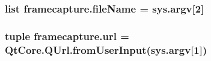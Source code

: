 \subsubsection[{file\+Name}]{\setlength{\rightskip}{0pt plus 5cm}list framecapture.\+file\+Name = sys.\+argv\mbox{[}2\mbox{]}}\label{namespaceframecapture_a9986642fe1c3b56d649b6411961b7ed5}
\hypertarget{namespaceframecapture_aff59b23fef660dedf48b2a105fa7d427}{}
\subsubsection[{url}]{\setlength{\rightskip}{0pt plus 5cm}tuple framecapture.\+url = Qt\+Core.\+Q\+Url.\+from\+User\+Input(sys.\+argv\mbox{[}1\mbox{]})}\label{namespaceframecapture_aff59b23fef660dedf48b2a105fa7d427}
